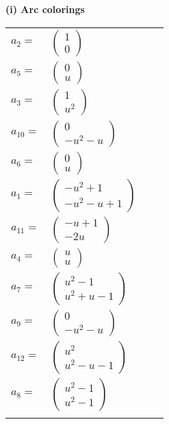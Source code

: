\documentclass[1p]{elsarticle_modified}
\theoremstyle{definition}
\begin{document}
\flushleft \textbf{(i) Arc colorings}\\
\begin{tabular}{m{7pt} m{180pt} m{7pt} m{180pt} }
\flushright $a_{2}=$&$\begin{pmatrix}1\\0\end{pmatrix}$ \\
\flushright $a_{5}=$&$\begin{pmatrix}0\\u\end{pmatrix}$ \\
\flushright $a_{3}=$&$\begin{pmatrix}1\\u^2\end{pmatrix}$ \\
\flushright $a_{10}=$&$\begin{pmatrix}0\\- u^2- u\end{pmatrix}$ \\
\flushright $a_{6}=$&$\begin{pmatrix}0\\u\end{pmatrix}$ \\
\flushright $a_{1}=$&$\begin{pmatrix}- u^2+1\\- u^2- u+1\end{pmatrix}$ \\
\flushright $a_{11}=$&$\begin{pmatrix}- u+1\\-2 u\end{pmatrix}$ \\
\flushright $a_{4}=$&$\begin{pmatrix}u\\u\end{pmatrix}$ \\
\flushright $a_{7}=$&$\begin{pmatrix}u^2-1\\u^2+u-1\end{pmatrix}$ \\
\flushright $a_{9}=$&$\begin{pmatrix}0\\- u^2- u\end{pmatrix}$ \\
\flushright $a_{12}=$&$\begin{pmatrix}u^2\\u^2- u-1\end{pmatrix}$ \\
\flushright $a_{8}=$&$\begin{pmatrix}u^2-1\\u^2-1\end{pmatrix}$\\&\end{tabular}
\end{document}
